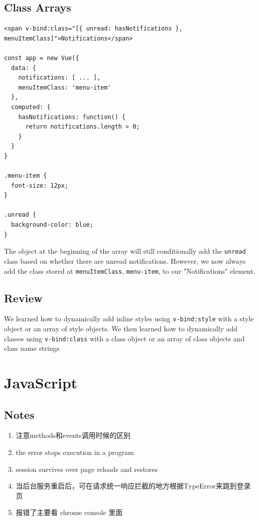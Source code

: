 \documentclass[a4paper, 12pt]{article}
\begin{document}
\subsection{Class Arrays}
\begin{verbatim}
<span v-bind:class="[{ unread: hasNotifications }, menuItemClass]">Notifications</span>

const app = new Vue({
  data: { 
    notifications: [ ... ],
    menuItemClass: 'menu-item'
  },
  computed: {
    hasNotifications: function() {
      return notifications.length > 0;
    }
  }
}

.menu-item {
  font-size: 12px;
}

.unread {
  background-color: blue;
}
\end{verbatim}
The object at the beginning of the array will still conditionally add the \verb|unread| class based on whether there are unread notifications. However, we now always add the class stored at \verb|menuItemClass|, \verb|menu-item|, to our "Notifications" element.

\subsection{Review}
We learned how to dynamically add inline styles using \verb|v-bind:style| with a style object or an array of style objects. We then learned how to dynamically add classes using \verb|v-bind:class| with a class object or an array of class objects and class name strings.


\section{JavaScript}

\subsection{Notes}
\begin{enumerate}
\item 注意methods和events调用时候的区别

\item the error stops execution in a program

\item session survives over page reloads and restores

\item 当后台服务重启后，可在请求统一响应拦截的地方根据TypeError来跳到登录页

\item 报错了主要看 chrome console 里面

\end{enumerate}
\end{document}
